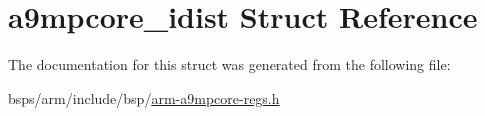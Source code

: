\hypertarget{structa9mpcore__idist}{}\section{a9mpcore\+\_\+idist Struct Reference}
\label{structa9mpcore__idist}


The documentation for this struct was generated from the following file\+:\begin{DoxyCompactItemize}
\item 
bsps/arm/include/bsp/\mbox{\hyperlink{arm-a9mpcore-regs_8h}{arm-\/a9mpcore-\/regs.\+h}}\end{DoxyCompactItemize}
